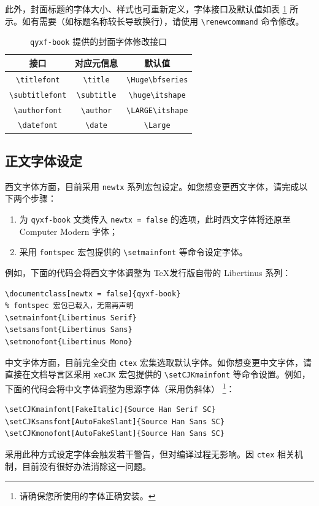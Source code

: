 \documentclass[
    10pt,
    oneside,
    openany,
    b5paper,
    colorscheme = basic  %
]{qyxf-book}
\renewcommand{\titlefont}{\Huge\bfseries}
\renewcommand{\subtitlefont}{\LARGE\itshape}
\begin{document}
此外，封面标题的字体大小、样式也可重新定义，字体接口及默认值如表 \ref{tab:preface-font} 所示。如有需要（如标题名称较长导致换行），请使用 \verb|\renewcommand| 命令修改。

\begin{table}[htbp]
\centering
\caption{\texttt{qyxf-book} 提供的封面字体修改接口}
\label{tab:preface-font}
\begin{tabular}{ccc}
\toprule
接口 & 对应元信息 & 默认值\\
\midrule
\verb|\titlefont| & \verb|\title| & \verb|\Huge\bfseries| \\
\verb|\subtitlefont| & \verb|\subtitle| & \verb|\huge\itshape| \\
\verb|\authorfont| & \verb|\author| & \verb|\LARGE\itshape| \\
\verb|\datefont| & \verb|\date| & \verb|\Large| \\
\bottomrule
\end{tabular}
\end{table}

\subsection{正文字体设定}

西文字体方面，目前采用 \verb|newtx| 系列宏包设定。如您想变更西文字体，请完成以下两个步骤：

\begin{enumerate}
    \item 为 \verb|qyxf-book| 文类传入 \verb|newtx = false| 的选项，此时西文字体将还原至 Computer Modern 字体；
    \item 采用 \verb|fontspec| 宏包提供的 \verb|\setmainfont| 等命令设定字体。
\end{enumerate}

例如，下面的代码会将西文字体调整为 \TeX 发行版自带的 Libertinus 系列：

\begin{tcolorbox}
\begin{verbatim}
\documentclass[newtx = false]{qyxf-book}
% fontspec 宏包已载入，无需再声明
\setmainfont{Libertinus Serif}
\setsansfont{Libertinus Sans}
\setmonofont{Libertinus Mono}
\end{verbatim}
\end{tcolorbox}

中文字体方面，目前完全交由 \verb|ctex| 宏集选取默认字体。如你想变更中文字体，请直接在文档导言区采用 \verb|xeCJK| 宏包提供的 \verb|\setCJKmainfont| 等命令设置。例如，下面的代码会将中文字体调整为思源字体（采用伪斜体）
\footnote{请确保您所使用的字体正确安装。}：
\begin{tcolorbox}
\begin{verbatim}
\setCJKmainfont[FakeItalic]{Source Han Serif SC}
\setCJKsansfont[AutoFakeSlant]{Source Han Sans SC}
\setCJKmonofont[AutoFakeSlant]{Source Han Sans SC}
\end{verbatim}
\end{tcolorbox}
采用此种方式设定字体会触发若干警告，但对编译过程无影响。因 \verb|ctex| 相关机制，目前没有很好办法消除这一问题。
\end{document}
